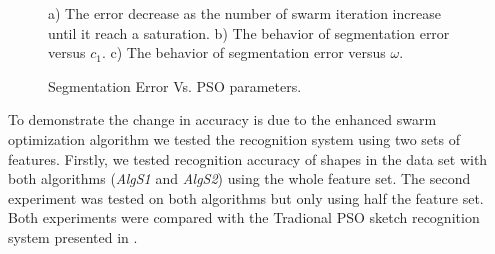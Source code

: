 \documentclass[preprint,1p,times,review]{elsarticle}
\begin{document}
 \begin{figure}
	\centering





	 	\caption{Segmentation Error Vs. PSO parameters.}a) The error
decrease as the number of swarm iteration increase until it reach a saturation.
 b) The behavior of segmentation error versus $c_1$. c) The behavior of
segmentation error versus  $\omega$.


\end{figure}


%

To demonstrate the change in accuracy is due to the enhanced swarm optimization algorithm we tested the recognition system using two sets of features. Firstly, we tested recognition accuracy of shapes in the data set with both algorithms (\textsl{AlgS1} and \textsl{AlgS2}) using the whole feature set. The second experiment was tested on both algorithms but only using half the feature set. Both experiments were compared with the Tradional PSO sketch recognition system presented in \cite{mypaper}.
\end{document}
